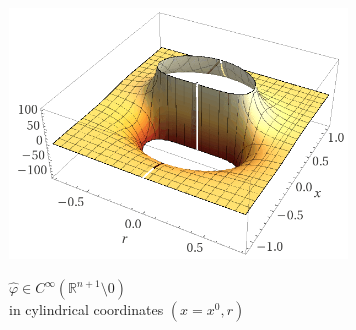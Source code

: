 \documentclass[beamer,handout,10pt]{standalone}
\begin{document}
\begin{frame}
\begin{propblock}
\begin{columns}[T]
\begin{column}{.50\linewidth}
\begin{flushright}
\begin{figure}
						\href{http://shorturl.at/hxFR5}{\includegraphics[width=0.8\textwidth]{Pictures/Figure_primitivePlot.png}}
  					\caption*{$\hat{\varphi}\in C^\infty (\mathbb{R}^{n+1}\setminus{0})$ \\ in cylindrical coordinates $(x=x^0,r)$}
					\end{figure}							
				\end{flushright}
				\vspace{-3.5ex}
	 	 	\end{column}
 	 \end{columns}
	\end{propblock}
\end{frame}
\end{document}
